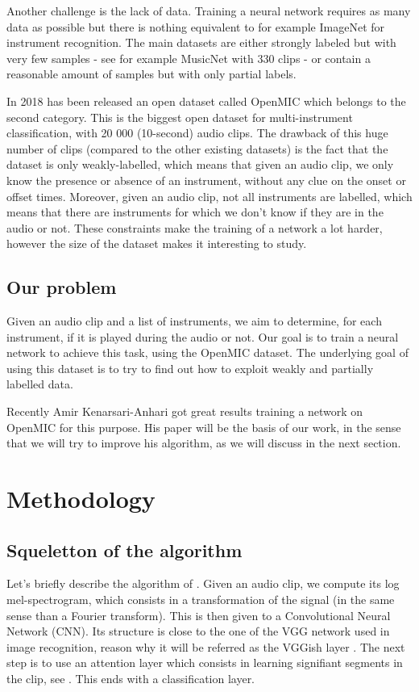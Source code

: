 \documentclass[final]{cvpr}
\begin{document}
Another challenge is the lack of data. Training a neural network requires as many data as possible but there is nothing equivalent to for example ImageNet for instrument recognition. The main datasets are either strongly labeled but with very few samples - see for example MusicNet \cite{MusicNet} with 330 clips - or contain a reasonable amount of samples but with only partial labels. 

In 2018 has been released an open dataset called OpenMIC \cite{MIC} which belongs to the second category. This is the biggest open dataset for multi-instrument classification, with 20 000 (10-second) audio clips. The drawback of this huge number of clips (compared to the other existing datasets) is the fact that the dataset is only weakly-labelled, which means that given an audio clip, we only know the presence or absence of an instrument, without any clue on the onset or offset times. Moreover, given an audio clip, not all instruments are labelled, which means that there are instruments for which we don't know if they are in the audio or not. These constraints make the training of a network a lot harder, however the size of the dataset makes it interesting to study.

\subsection{Our problem}

Given an audio clip and a list of instruments, we aim to determine, for each instrument, if it is played during the audio or not. Our goal is to train a neural network to achieve this task, using the OpenMIC dataset. The underlying goal of using this dataset is to try to find out how to exploit weakly and partially labelled data. 

Recently Amir Kenarsari-Anhari \cite{squelette_progr} got great results training a network on OpenMIC for this purpose. His paper will be the basis of our work, in the sense that we will try to improve his algorithm, as we will discuss in the next section.
\section{Methodology}
\subsection{Squeletton of the algorithm}
Let's briefly describe the algorithm of \cite{squelette_progr}. Given an audio clip, we compute its log mel-spectrogram, which consists in a transformation of the signal (in the same sense than a Fourier transform). This is then given to a Convolutional Neural Network (CNN). Its structure is close to the one of the VGG network used in image recognition, reason why it will be referred as the VGGish layer \cite{VGGish_net}. The next step is to use an attention layer which consists in learning signifiant segments in the clip, see \cite{attention}. This ends with a classification layer.
\end{document}
